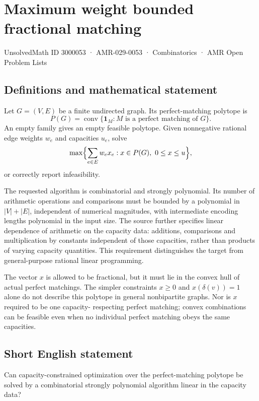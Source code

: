 \documentclass[11pt,a4paper]{article}
\begin{document}
\section*{Maximum weight bounded fractional matching}\label{3000053}
{\small UnsolvedMath ID 3000053 · AMR-029-0053 · Combinatorics · AMR Open Problem Lists}
\subsection{Definitions and mathematical statement}
Let $G=(V,E)$ be a finite undirected graph. Its perfect-matching
polytope is
\[
       P(G)=\operatorname{conv}\{\mathbf1_M:M\text{ is a perfect matching of }G\}.
\]
An empty family gives an empty feasible polytope. Given nonnegative
rational edge weights $w_e$ and capacities $u_e$, solve
\[
                  \max\Bigl\{\sum_{e\in E}w_ex_e:
                                    x\in P(G),\ 0\le x\le u\Bigr\},
\]
or correctly report infeasibility.

The requested algorithm is combinatorial and strongly polynomial.
Its number of arithmetic operations and comparisons must be bounded
by a polynomial in $|V|+|E|$, independent of numerical magnitudes,
with intermediate encoding lengths polynomial in the input size.
The source further specifies linear dependence of arithmetic on the
capacity data: additions, comparisons and multiplication by constants
independent of those capacities, rather than products of varying
capacity quantities. This requirement distinguishes the target from
general-purpose rational linear programming.

The vector $x$ is allowed to be fractional, but it must lie in the
convex hull of actual perfect matchings. The simpler constraints
$x\ge0$ and $x(\delta(v))=1$ alone do not describe this polytope in
general nonbipartite graphs. Nor is $x$ required to be one capacity-
respecting perfect matching; convex combinations can be feasible
even when no individual perfect matching obeys the same capacities.
\subsection{Short English statement}
Can capacity-constrained optimization over the perfect-matching
polytope be solved by a combinatorial strongly polynomial algorithm linear in the capacity data?
\end{document}

